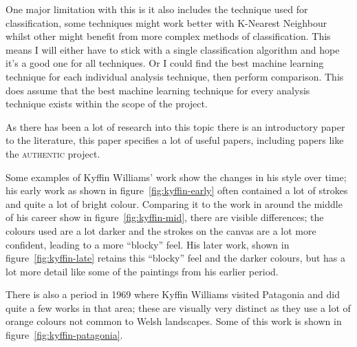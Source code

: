 \documentclass[11pt,fleqn,twoside]{article}
\begin{document}
One major limitation with this is it also includes the technique used for classification, some
techniques might work better with K-Nearest Neighbour whilst other might benefit from more complex
methods of classification. This means I will either have to stick with a single classification
algorithm and hope it's a good one for all techniques. Or I could find the best machine learning
technique for each individual analysis technique, then perform comparison. This does assume that
the best machine learning technique for every analysis technique exists within the scope of the
project.

As there has been a lot of research into this topic there is an introductory paper to the 
literature\cite{Stork2009Computer}, this paper specifies a lot of useful papers, including papers
like the \textsc{authentic} project\cite{Berezhnoy2005Authentic}.

Some examples of Kyffin Williams' work show the changes in his style over time; his early work as
shown in figure~\ref{fig:kyffin-early} often contained a lot of strokes and quite a lot of bright
colour. Comparing it to the work in around the middle of his career show in figure~\ref{fig:kyffin-mid}, there are visible differences;
the colours used are a lot darker and the strokes on the canvas are a lot more confident, leading
to a more ``blocky'' feel. His later work, shown in figure~\ref{fig:kyffin-late} retains this 
``blocky'' feel and the darker colours, but has a lot more detail like some of the paintings from
his earlier period.

There is also a period in 1969 where Kyffin Williams visited Patagonia and did quite a few works
in that area; these are visually very distinct as they use a lot of orange colours not common to
Welsh landscapes. Some of this work is shown in figure~\ref{fig:kyffin-patagonia}.
\end{document}
